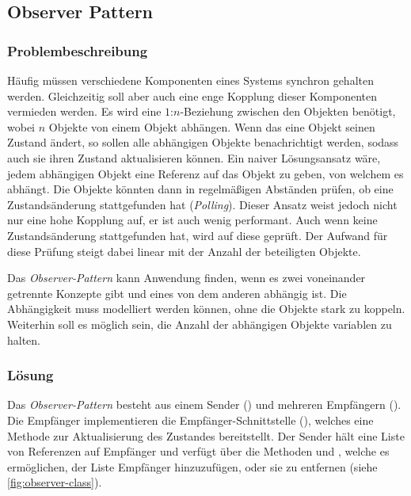 \subsection{Observer Pattern}


\subsubsection*{Problembeschreibung}

Häufig müssen verschiedene Komponenten eines Systems synchron gehalten werden. Gleichzeitig soll aber auch eine enge Kopplung dieser Komponenten vermieden werden. Es wird eine $1$:$n$-Beziehung zwischen den Objekten benötigt, wobei $n$ Objekte von einem Objekt abhängen. Wenn das eine Objekt seinen Zustand ändert, so sollen alle abhängigen Objekte benachrichtigt werden, sodass auch sie ihren Zustand aktualisieren können. Ein naiver Lösungsansatz wäre, jedem abhängigen Objekt eine Referenz auf das Objekt zu geben, von welchem es abhängt. Die Objekte könnten dann in regelmäßigen Abständen prüfen, ob eine Zustandsänderung stattgefunden hat (\emph{Polling}). Dieser Ansatz weist jedoch nicht nur eine hohe Kopplung auf, er ist auch wenig performant. Auch wenn keine Zustandsänderung stattgefunden hat, wird auf diese geprüft. Der Aufwand für diese Prüfung steigt dabei linear mit der Anzahl der beteiligten Objekte.

Das \emph{Observer-Pattern} kann Anwendung finden, wenn es zwei voneinander getrennte Konzepte gibt und eines von dem anderen abhängig ist. Die Abhängigkeit muss modelliert werden können, ohne die Objekte stark zu koppeln. Weiterhin soll es möglich sein, die Anzahl der abhängigen Objekte variablen zu halten. \cite{gamma_design_1995}

\subsubsection*{Lösung}

Das \emph{Observer-Pattern} besteht aus einem Sender () und mehreren Empfängern (). Die Empfänger implementieren die Empfänger-Schnittstelle (), welches eine Methode  zur Aktualisierung des Zustandes bereitstellt. Der Sender hält eine Liste von Referenzen auf Empfänger und verfügt über die Methoden  und , welche es ermöglichen, der Liste Empfänger hinzuzufügen, oder sie zu entfernen (siehe \autoref{fig:observer-class}).

